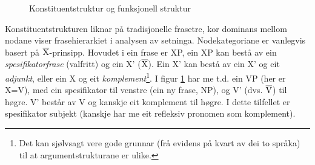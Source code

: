 \documentclass[12pt,a4paper,oneside,draft]{report}
\newcommand{\xbar}{$\rm\overline{X}$}
\newcommand{\proj}[2]{\begin{tabular}{c}\footnotesize{#1}\\\normalsize{#2}\end{tabular}}
\newcommand{\ua}{\ensuremath{\uparrow}}
\newcommand{\da}{\ensuremath{\downarrow}}
\begin{document}
 \begin{figure}[htp]
    \centering

    \caption{Konstituentstruktur og funksjonell struktur}
   \label{fig:f-og-c-struktur}
 \end{figure}

 Konstituentstrukturen liknar på tradisjonelle frasetre, kor dominans
 mellom nodane viser frasehierarkiet i analysen av
 setninga. Nodekategoriane er vanlegvis basert på
 \xbar-prinsipp. Hovudet i ein frase er XP, ein XP kan bestå av ein
 \emph{spesifikatorfrase} (valfritt) og ein X' (\xbar). Ein X' kan bestå av
 ein X' og eit \emph{adjunkt}, eller ein X og eit \emph{komplement}\footnote{Det kan sjølvsagt vere gode grunnar (frå evidens på kvart av
        dei to språka) til at argumentstrukturane er ulike. }. I
 figur \ref{fig:f-og-c-struktur} har me t.d. ein VP (her er X=V), med
 ein spesifikator til venstre (ein ny frase, NP), og V'
 (dvs. $\rm\overline{V}$) til høgre. V' består av V og kanskje eit
 komplement til høgre. I dette tilfellet er spesifikator subjekt
 (kanskje har me eit refleksiv pronomen som komplement). 
\end{document}
